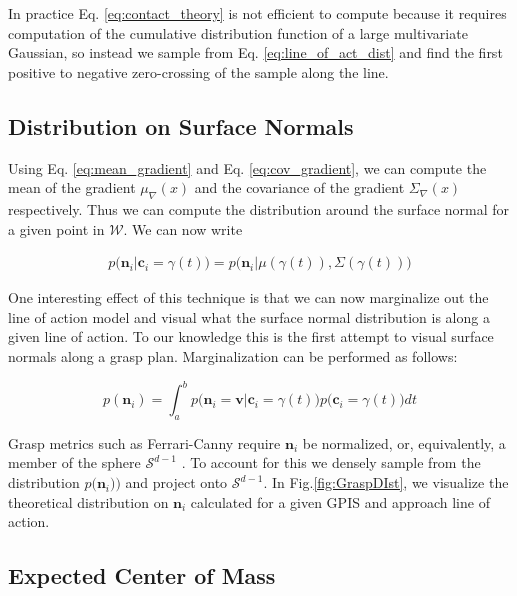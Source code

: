 \documentclass[letterpaper, 10 pt, conference]{ieeeconf}  %
\begin{document}
In practice Eq. \ref{eq:contact_theory} is not efficient to compute because it requires computation of the cumulative distribution function of a large multivariate Gaussian, so instead we sample from Eq. \ref{eq:line_of_act_dist} and find the first positive to negative zero-crossing of the sample along the line. 


\subsection{Distribution on Surface Normals}\label{sec:normals} 
Using Eq. \ref{eq:mean_gradient} and Eq. \ref{eq:cov_gradient}, we can compute the mean of the gradient $ \mu_{\nabla}(x)$ and the covariance of the gradient $\Sigma_{\nabla}(x)$ respectively. Thus we can compute the distribution around the surface normal for a given point in $\mathcal{W}$. We can now write 

\vspace{-2ex}
\begin{align*}
p\big(\textbf{n}_i|\textbf{c}_i = \gamma(t)\big) = p\big(\textbf{n}_i |\mu(\gamma(t)), \Sigma(\gamma(t)) \big)
\end{align*}

One interesting effect of this technique is that we can now marginalize out the line of action model and visual what the surface normal distribution is along a given line of action. To our knowledge this is the first attempt to visual surface normals along a grasp plan. Marginalization can be performed as follows:

\vspace{-2ex}
\begin{equation}
p(\textbf{n}_i ) = \int_a^b   p\big(\textbf{n}_i = \textbf{v} | \textbf{c}_i = \gamma(t) \big)p\big(\textbf{c}_i = \gamma(t)\big) dt
\end{equation}

Grasp metrics such as  Ferrari-Canny require $\textbf{n}_i$ be normalized, or, equivalently, a member of the sphere $\mathcal{S}^{d-1}$ \cite{ferrari1992}. To account for this we densely sample from the  distribution $p \big(\textbf{n}_i ) \big)$  and project onto $\mathcal{S}^{d-1}$.  In Fig.\ref{fig:GraspDIst}, we visualize the theoretical distribution on $\textbf{n}_i$ calculated for a given GPIS and approach line of action.


\subsection{Expected Center of Mass}\label{sec:mass} 
\end{document}
